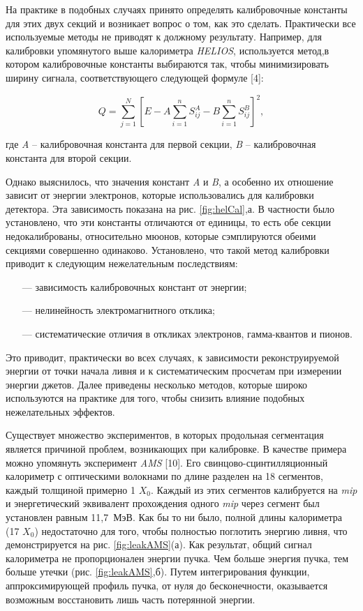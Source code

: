 На практике в подобных случаях принято определять калибровочные константы для этих двух секций и возникает вопрос о том, как это сделать. Практически все используемые методы не приводят к должному результату. Например,  для калибровки  упомянутого  выше  калориметра \textit{HELIOS}, используется  метод,в  котором  калибровочные  константы  выбираются  так, чтобы  минимизировать  ширину  сигнала,  соответствующего  следующей формуле [4]:

\begin{equation}\label{eq:helCalCond}
Q = \sum_{j=1}^N
\left[
E-A\sum_{i=1}^n S_{ij}^A
- B\sum_{i=1}^n S_{ij}^B
\right]^2,
\end{equation}

где \textit{A} – калибровочная  константа  для  первой  секции, \textit{B} – калибровочная константа для второй секции.

Однако выяснилось,  что  значения  констант \textit{A} и \textit{B}, а  особенно  их отношение  зависит  от  энергии  электронов,  которые  использовались  для калибровки детектора. Эта зависимость показана на рис. \ref{fig:helCal},а. В частности было установлено, что эти константы отличаются  от единицы, то есть обе секции  недокалиброваны,  относительно  мюонов,  которые  сэмплируются обеими  секциями  совершенно  одинаково.  Установлено,  что  такой  метод калибровки приводит к следующим нежелательным последствиям:

\begin{itemize}[leftmargin=1.6\parindent, wide]
\item[---] зависимость калибровочных констант от энергии;
\item[---] нелинейность электромагнитного отклика;
\item[---] систематические отличия 	в откликах электронов, гамма-квантов и пионов.
\end{itemize}

Это  приводит,  практически  во  всех  случаях,  к  зависимости реконструируемой  энергии  от  точки  начала  ливня  и  к  систематическим просчетам  при  измерении  энергии  джетов.  Далее  приведены  несколько методов, которые широко используются на практике для того, чтобы снизить влияние подобных нежелательных эффектов. 

Существует  множество  экспериментов,  в  которых  продольная сегментация  является  причиной проблем,  возникающих  при калибровке. В качестве примера можно упомянуть эксперимент \textit{AMS} [10]. Его свинцово-сцинтилляционный калориметр с оптическими волокнами по длине разделен на 18 сегментов, каждый толщиной примерно 1 $X_0$. Каждый из этих сегментов  калибруется  на \textit{mip} и  энергетический  эквивалент  прохождения одного \textit{mip} через сегмент был установлен равным \mbox{11,7 МэВ}. Как бы то ни было,  полной  длины  калориметра  (17 $X_0$)  недостаточно  для  того,  чтобы полностью поглотить энергию ливня, что демонстрируется на рис. \ref{fig:leakAMS}(а). Как результат, общий сигнал калориметра не пропорционален энергии пучка. Чем больше энергия пучка, тем больше утечки (рис. \ref{fig:leakAMS},б). Путем интегрирования функции,  аппроксимирующей  профиль  пучка,  от  нуля  до  бесконечности, оказывается возможным восстановить лишь часть потерянной энергии.

